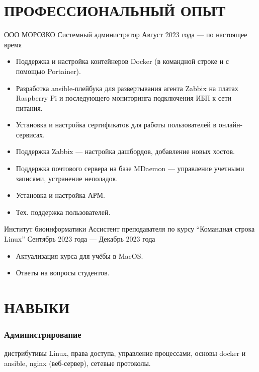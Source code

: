 \documentclass[9pt]{article}
\begin{document}
\maketitle

\section{ПРОФЕССИОНАЛЬНЫЙ ОПЫТ}

    \job
        {ООО МОРОЗКО}
        {Системный администратор}
        {Август 2023 года --- по настоящее время}
        {
            \begin{itemize}
                \setlength\itemsep{-.5em}
                \item Поддержка и настройка контейнеров Docker (в командной строке и с помощью Portainer).
                \item Разработка ansible-плейбука для развертывания агента Zabbix на платах Raspberry Pi и последующего мониторинга подключения ИБП к сети питания.
                \item Установка и настройка сертификатов для работы пользователей в онлайн-сервисах.
                \item Поддержка Zabbix — настройка дашбордов, добавление новых хостов.
                \item Поддержка почтового сервера на базе MDaemon — управление учетными записями, устранение неполадок.
                \item Установка и настройка АРМ.
                \item Тех. поддержка пользователей.
            \end{itemize}
        }
    
    \job
        {Институт биоинформатики}
        {Ассистент преподавателя по курсу “Командная строка Linux”}
        {Сентябрь 2023 года — Декабрь 2023 года}
        {
            \begin{itemize}
                \setlength\itemsep{-.5em}
                \item Актуализация курса для учёбы в MacOS.
                \item Ответы на вопросы студентов.
            \end{itemize}
        }

\section{НАВЫКИ}

    \subsubsection{Администрирование}
    дистрибутивы Linux, права доступа, управление процессами, основы docker и ansible, nginx (веб-сервер),
    сетевые протоколы.
    
\end{document}
